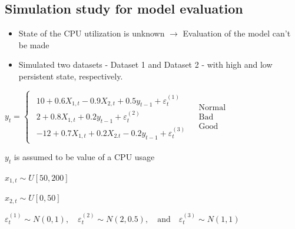 \documentclass{beamer}
\begin{document}
\subsection{Simulation study for model evaluation}
\begin{frame}
\begin{itemize}
	\item State of the CPU utilization is unknown $\rightarrow$ Evaluation of the model can't be made
	\pause
	\vspace{1em}
	
	\item Simulated two datasets - Dataset 1 and Dataset 2 - with high and low persistent state, respectively.
\end{itemize}

$y_{t}=\begin{cases}
	\begin{array}{c}
		10+0.6X_{1,t}-0.9X{}_{2,t}+0.5y_{t-1}+\varepsilon_{t}^{(1)}\\
		2+0.8X_{1,t}+0.2y_{t-1}+\varepsilon_{t}^{(2)}\\
		-12+0.7X_{1,t}+0.2X{}_{2.t}-0.2y_{t-1}+\varepsilon_{t}^{(3)}
	\end{array} & \begin{array}{c}
		\mathrm{Normal}\\
		\mathrm{Bad}\\
		\mathrm{Good}
\end{array}\end{cases}$
\vspace{1em}

$y_{t}$ is assumed to be value of a CPU usage

$x_{1,t}\sim U[50,200]$

$x_{2,t}\sim U[0,50]$ 

$\varepsilon_{t}^{(1)}\sim N(0,1),\quad \varepsilon_{t}^{(2)}\sim N(2,0.5),\quad \mathrm{and} \quad \varepsilon_{t}^{(3)}\sim N(1,1)$

\end{frame}
\end{document}

